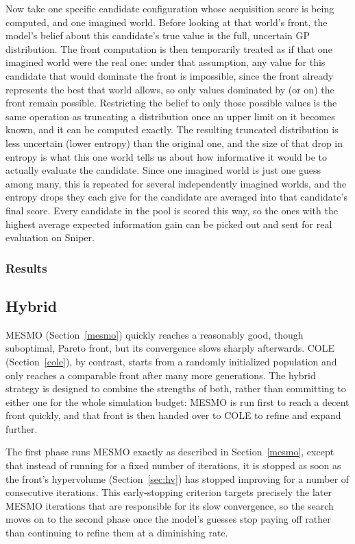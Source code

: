 \documentclass[12pt,a4paper,faculty=ea,language=en]{ugent-doc}
\begin{document}
Now take one specific candidate configuration whose acquisition score is being computed, and one imagined world. Before looking at that world's front, the model's belief about this candidate's true value is the full, uncertain GP distribution. The front computation is then temporarily treated as if that one imagined world were the real one: under that assumption, any value for this candidate that would dominate the front is impossible, since the front already represents the best that world allows, so only values dominated by (or on) the front remain possible. Restricting the belief to only those possible values is the same operation as truncating a distribution once an upper limit on it becomes known, and it can be computed exactly. The resulting truncated distribution is less uncertain (lower entropy) than the original one, and the size of that drop in entropy is what this one world tells us about how informative it would be to actually evaluate the candidate. Since one imagined world is just one guess among many, this is repeated for several independently imagined worlds, and the entropy drops they each give for the candidate are averaged into that candidate's final score. Every candidate in the pool is scored this way, so the ones with the highest average expected information gain can be picked out and sent for real evaluation on Sniper.
\subsubsection{Results}
\subsection{Hybrid}
MESMO (Section~\ref{mesmo}) quickly reaches a reasonably good, though suboptimal, Pareto front, but its convergence slows sharply afterwards. COLE (Section~\ref{cole}), by contrast, starts from a randomly initialized population and only reaches a comparable front after many more generations. The hybrid strategy is designed to combine the strengths of both, rather than committing to either one for the whole simulation budget: MESMO is run first to reach a decent front quickly, and that front is then handed over to COLE to refine and expand further.

The first phase runs MESMO exactly as described in Section~\ref{mesmo}, except that instead of running for a fixed number of iterations, it is stopped as soon as the front's hypervolume (Section~\ref{sec:hv}) has stopped improving for a number of consecutive iterations. This early-stopping criterion targets precisely the later MESMO iterations that are responsible for its slow convergence, so the search moves on to the second phase once the model's guesses stop paying off rather than continuing to refine them at a diminishing rate.
\end{document}

